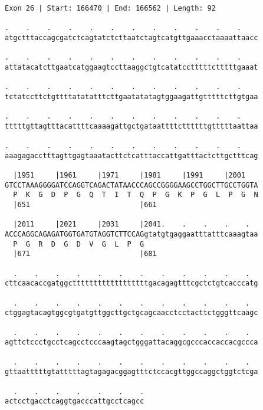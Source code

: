 \documentclass{article}
\begin{document}
\newpage
\begin{Verbatim}[fontfamily=courier]
Exon 26 | Start: 166470 | End: 166562 | Length: 92

.    .    .    .    .    .    .    .    .    .    .    .    
atgctttaccagcgatctcagtatctcttaatctagtcatgttgaaacctaaaattaacc

.    .    .    .    .    .    .    .    .    .    .    .    
attatacatcttgaatcatggaagtccttaaggctgtcatatcctttttctttttgaaat

.    .    .    .    .    .    .    .    .    .    .    .    
tctatccttctgttttatatatttcttgaatatatagtggaagattgtttttcttgtgaa

.    .    .    .    .    .    .    .    .    .    .    .    
tttttgttagtttacattttcaaaagattgctgataattttcttttttgtttttaattaa

.    .    .    .    .    .    .    .    .    .    .    .    
aaagagacctttagttgagtaaatacttctcatttaccattgatttactcttgctttcag

  |1951     |1961     |1971     |1981     |1991     |2001   
GTCCTAAAGGGGATCCAGGTCAGACTATAACCCAGCCGGGGAAGCCTGGCTTGCCTGGTA
  P  K  G  D  P  G  Q  T  I  T  Q  P  G  K  P  G  L  P  G  N
  |651                          |661                        

  |2011     |2021     |2031     |2041.    .    .    .    .  
ACCCAGGCAGAGATGGTGATGTAGGTCTTCCAGgtatgtgaggaatttatttcaaagtaa
  P  G  R  D  G  D  V  G  L  P  G                           
  |671                          |681                        

  .    .    .    .    .    .    .    .    .    .    .    .  
cttcaacaccgatggcttttttttttttttttttgacagagtttcgctctgtcacccatg

  .    .    .    .    .    .    .    .    .    .    .    .  
ctggagtacagtggcgtgatgttggcttgctgcagcaacctcctacttctgggttcaagc

  .    .    .    .    .    .    .    .    .    .    .    .  
agttctccctgcctcagcctcccaagtagctgggattacaggcgcccaccaccacgccca

  .    .    .    .    .    .    .    .    .    .    .    .  
gttaatttttgtatttttagtagagacggagtttctccacgttggccaggctggtctcga

  .    .    .    .    .    .    .
actcctgacctcaggtgacccattgcctcagcc
\end{Verbatim}
\newpage
\end{document}
